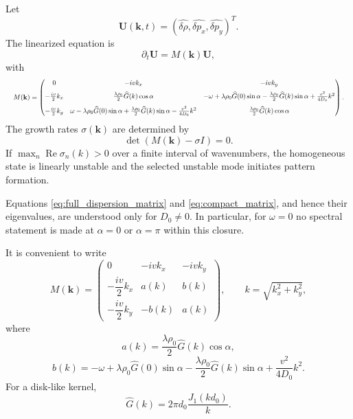 \documentclass[11pt]{article}
\numberwithin{equation}{section}
\begin{document}
Let
\begin{equation}
  \mathbf U(\mathbf k,t)=
  (\widehat{\delta\rho},\widehat{\delta p_x},\widehat{\delta p_y})^T .
\end{equation}
The linearized equation is
\begin{equation}
  \partial_t\mathbf U=M(\mathbf k)\mathbf U,
\end{equation}
with
\begin{equation}
\resizebox{\linewidth}{!}{$
M(\mathbf k)=
\begin{pmatrix}
0 & -ivk_x & -ivk_y\\[6pt]
-\frac{iv}{2}k_x & \frac{\lambda\rho_0}{2}\widehat G(k)\cos\alpha &
-\omega+\lambda\rho_0\widehat G(0)\sin\alpha-\frac{\lambda\rho_0}{2}\widehat G(k)\sin\alpha+\frac{v^2}{4D_0}k^2\\[8pt]
-\frac{iv}{2}k_y &
\omega-\lambda\rho_0\widehat G(0)\sin\alpha+\frac{\lambda\rho_0}{2}\widehat G(k)\sin\alpha-\frac{v^2}{4D_0}k^2 &
\frac{\lambda\rho_0}{2}\widehat G(k)\cos\alpha
\end{pmatrix}.
$}
\label{eq:full_dispersion_matrix}
\end{equation}
The growth rates $\sigma(\mathbf k)$ are determined by
\begin{equation}
  \det(M(\mathbf k)-\sigma I)=0.
\end{equation}
If $\max_n \operatorname{Re}\sigma_n(k)>0$ over a finite interval of
wavenumbers, the homogeneous state is linearly unstable and the selected
unstable mode initiates pattern formation.

Equations \eqref{eq:full_dispersion_matrix} and
\eqref{eq:compact_matrix}, and hence their eigenvalues, are understood
only for $D_0\ne0$. In particular, for $\omega=0$ no spectral statement is
made at $\alpha=0$ or $\alpha=\pi$ within this closure.

It is convenient to write
\begin{equation}
M(\mathbf k)=
\begin{pmatrix}
0 & -ivk_x & -ivk_y\\[4pt]
-\dfrac{iv}{2}k_x & a(k) & b(k)\\[4pt]
-\dfrac{iv}{2}k_y & -b(k) & a(k)
\end{pmatrix},
\qquad k=\sqrt{k_x^2+k_y^2},
\label{eq:compact_matrix}
\end{equation}
where
\begin{equation}
  a(k)=\frac{\lambda\rho_0}{2}\widehat G(k)\cos\alpha,
\end{equation}
\begin{equation}
  b(k)=
  -\omega+\lambda\rho_0\widehat G(0)\sin\alpha
  -\frac{\lambda\rho_0}{2}\widehat G(k)\sin\alpha
  +\frac{v^2}{4D_0}k^2 .
\end{equation}
For a disk-like kernel,
\begin{equation}
  \widehat G(k)=2\pi d_0\frac{J_1(kd_0)}{k}.
\end{equation}
\end{document}
